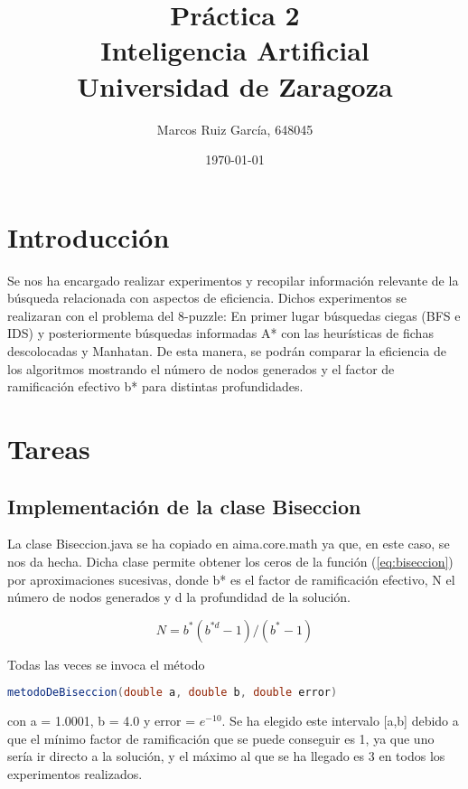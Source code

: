 \documentclass[a4paper]{article}
\title{Práctica 2 \\ Inteligencia Artificial \\ \large Universidad de Zaragoza}
\author{Marcos Ruiz García, 648045}
\date{\today}
\begin{document}
\maketitle

\tableofcontents

\section{Introducción}
Se nos ha encargado realizar experimentos y recopilar información relevante de la búsqueda relacionada con aspectos de eficiencia. Dichos experimentos se realizaran con el problema del 8-puzzle: En primer lugar búsquedas ciegas (BFS e IDS) y posteriormente búsquedas informadas A* con las heurísticas de fichas descolocadas y Manhatan. De esta manera, se podrán comparar la eficiencia de los algoritmos mostrando el número de nodos generados y el factor de ramificación efectivo b* para distintas profundidades.

\section{Tareas}


\subsection{Implementación de la clase Biseccion}
La clase Biseccion.java se ha copiado en aima.core.math ya que, en este caso, se nos da hecha. Dicha clase permite obtener los ceros de la función (\ref{eq:biseccion}) por aproximaciones sucesivas, donde b* es el factor de ramificación efectivo, N el número de nodos generados y d la profundidad de la solución.

\begin{equation}
\label{eq:biseccion}
N = b^{*} (b^{*d} - 1) / (b^{*} - 1)
\end{equation}

Todas las veces se invoca el método 
\begin{lstlisting}[language=Java] 
metodoDeBiseccion(double a, double b, double error) 
\end{lstlisting}
 con a = 1.0001, b = 4.0 y error = $e^{-10}$. Se ha elegido este intervalo [a,b] debido a que el mínimo factor de ramificación que se puede conseguir es 1, ya que uno sería ir directo a la solución, y el máximo al que se ha llegado es 3 en todos los experimentos realizados.
\end{document}

